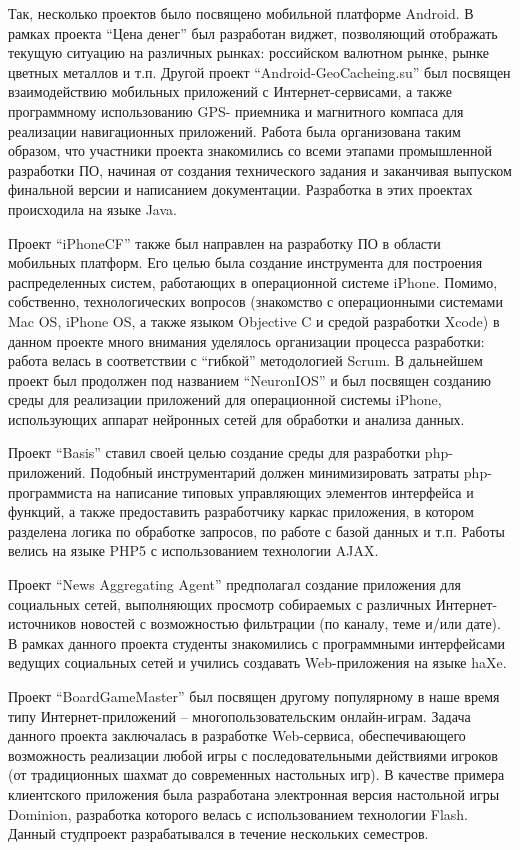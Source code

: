 \documentclass[a5paper]{article}
\begin{document}
Так, несколько проектов было посвящено мобильной платформе Android. В рамках проекта ``Цена денег'' был разработан виджет, позволяющий отображать текущую ситуацию на различных рынках: российском валютном рынке, рынке цветных металлов и т.п. Другой проект ``Android-GeoCacheing.su'' был посвящен взаимодействию мобильных приложений с Интернет-сервисами, а также программному использованию GPS- приемника и магнитного компаса для реализации навигационных приложений. Работа была организована таким образом, что участники проекта знакомились со всеми этапами промышленной разработки ПО, начиная от создания технического задания и заканчивая выпуском финальной версии и написанием документации. Разработка в этих проектах происходила на языке Java. 

Проект ``iPhoneCF'' также был направлен на разработку ПО в области мобильных платформ. Его целью была создание инструмента для построения распределенных систем, работающих в операционной системе iPhone. Помимо, собственно, технологических вопросов (знакомство с операционными системами Mac OS, iPhone OS, а также языком Objective C и средой разработки Xcode) в данном проекте много внимания уделялось организации процесса разработки: работа велась в соответствии с ``гибкой'' методологией Scrum. В дальнейшем проект был продолжен под названием ``NeuronIOS'' и был посвящен созданию среды для реализации приложений для операционной системы iPhone, использующих аппарат нейронных сетей для обработки и анализа данных.

Проект ``Basis'' ставил своей целью создание среды для разработки php-приложений. Подобный инструментарий должен минимизировать затраты php-программиста на написание типовых управляющих элементов интерфейса и функций, а также предоставить разработчику каркас приложения, в котором разделена логика по обработке запросов, по работе с базой данных и т.п. Работы велись на языке PHP5 с использованием технологии AJAX.

Проект ``News Aggregating Agent'' предполагал создание приложения для социальных сетей, выполняющих просмотр собираемых с различных Интернет-источников новостей с возможностью фильтрации (по каналу, теме и/или дате). В рамках данного проекта студенты знакомились с программными интерфейсами ведущих социальных сетей и учились создавать Web-приложения на языке haXe.

Проект ``BoardGameMaster'' был посвящен другому популярному в наше время типу Интернет-приложений -- многопользовательским онлайн-играм. Задача данного проекта заключалась в разработке Web-сервиса, обеспечивающего возможность реализации любой игры с последовательными действиями игроков (от традиционных шахмат до современных настольных игр). В качестве примера клиентского приложения была разработана электронная версия настольной игры Dominion, разработка которого велась с использованием технологии Flash. Данный студпроект разрабатывался  в течение нескольких семестров.
\end{document}
